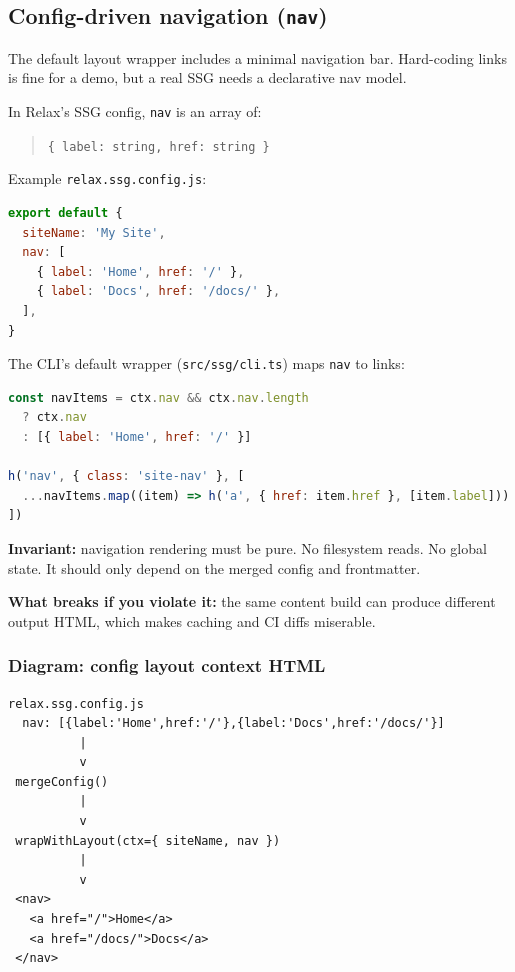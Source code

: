 \subsection{Config-driven navigation (\texttt{nav})}
The default layout wrapper includes a minimal navigation bar.
Hard-coding links is fine for a demo, but a real SSG needs a declarative nav model.

In Relax's SSG config, \texttt{nav} is an array of:

\begin{quote}
	\texttt{\{ label: string, href: string \}}
\end{quote}

Example \texttt{relax.ssg.config.js}:

\begin{lstlisting}[style=relax,language=JavaScript,caption={Config nav entries drive the rendered header nav.}]
export default {
  siteName: 'My Site',
  nav: [
    { label: 'Home', href: '/' },
    { label: 'Docs', href: '/docs/' },
  ],
}
\end{lstlisting}

The CLI's default wrapper (\texttt{src/ssg/cli.ts}) maps \texttt{nav} to links:

\begin{lstlisting}[style=relax,language=JavaScript,caption={Default layout nav rendering (simplified).}]
const navItems = ctx.nav && ctx.nav.length
  ? ctx.nav
  : [{ label: 'Home', href: '/' }]

h('nav', { class: 'site-nav' }, [
  ...navItems.map((item) => h('a', { href: item.href }, [item.label]))
])
\end{lstlisting}

	\textbf{Invariant:} navigation rendering must be pure.
No filesystem reads.
No global state.
It should only depend on the merged config and frontmatter.

	\textbf{What breaks if you violate it:}
the same content build can produce different output HTML, which makes caching and CI diffs miserable.

\subsubsection{Diagram: config \textrightarrow layout context \textrightarrow HTML}
\begin{verbatim}
relax.ssg.config.js
  nav: [{label:'Home',href:'/'},{label:'Docs',href:'/docs/'}]
          |
          v
 mergeConfig()
          |
          v
 wrapWithLayout(ctx={ siteName, nav })
          |
          v
 <nav>
   <a href="/">Home</a>
   <a href="/docs/">Docs</a>
 </nav>
\end{verbatim}

